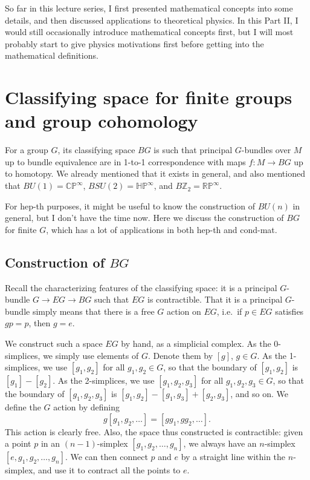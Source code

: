 \documentclass[12pt]{article}
\numberwithin{equation}{section}
\numberwithin{figure}{section}
\theoremstyle{remark}
\def\bZ{\mathbb{Z}}
\def\RP{\mathbb{RP}}
\def\CP{\mathbb{CP}}
\def\HP{\mathbb{HP}}
\begin{document}
So far in this lecture series, I first presented mathematical concepts into some details,
and then discussed applications to theoretical physics. 
In this Part II, I would still occasionally introduce mathematical concepts first,
but I will most probably start to give physics motivations first
before getting into the mathematical definitions.

\section{Classifying space for finite groups and group cohomology}

For a group $G$, its classifying space $BG$ is such that principal $G$-bundles over $M$
up to bundle equivalence are in 1-to-1 correspondence with
maps $f:M\to BG$  up to homotopy.
We already mentioned that it exists in general,
and also mentioned that $BU(1)=\CP^\infty$, $BSU(2)=\HP^\infty$, and $B\bZ_2=\RP^\infty$.

For hep-th purposes, it might be useful to know the construction of $BU(n)$ in general, 
but I don't have the time now.
Here we discuss the construction of $BG$ for finite $G$, which has a lot of applications
in both hep-th and cond-mat.

\subsection{Construction of $BG$}

Recall the characterizing features of the classifying space: it is a principal $G$-bundle
$G\to EG\to BG$ such that $EG$ is contractible. 
That it is a principal $G$-bundle simply means that there is a free $G$ action on $EG$,
i.e.~if $p\in EG$ satisfies $gp=p$, then $g=e$. 

We construct such a space $EG$ by hand, as a simplicial complex.
As the 0-simplices, we simply use elements of $G$. Denote them by $[g]$, $g\in G$.
As the 1-simplices, we use $[g_1,g_2]$ for all $g_1,g_2\in G$,
so that the boundary of $[g_1,g_2]$ is $[g_1]-[g_2]$.
As the 2-simplices, we use $[g_1,g_2,g_3]$ for all $g_1,g_2,g_3\in G$,
so that the boundary of $[g_1,g_2,g_3]$ is $[g_1,g_2]-[g_1,g_3]+[g_2,g_3]$,
and so on.
We define the $G$ action by defining \begin{equation}
g[g_1,g_2,\ldots] = [gg_1,gg_2,\ldots].
\end{equation}
This action is clearly free.
Also, the space thus constructed is contractible: 
given a point $p$ in an $(n-1)$-simplex $[g_1,g_2,\ldots, g_{n}]$,
we always have an $n$-simplex $[e,g_1,g_2,\ldots,g_n]$.
We can then connect  $p$ and $e$ by a straight line within the $n$-simplex,
and use it to contract all the points to $e$.
\end{document}
